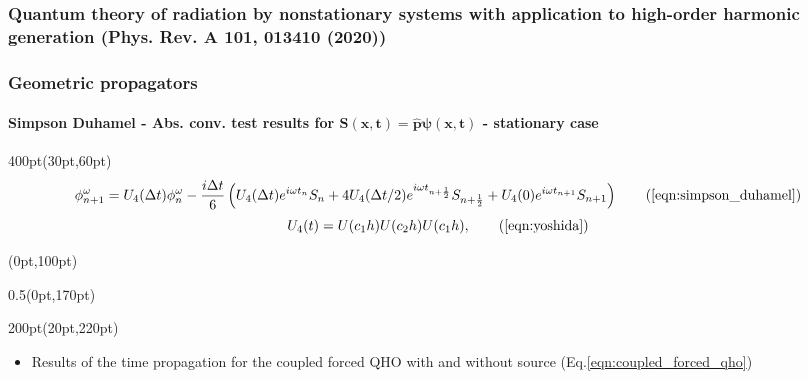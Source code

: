 \begin{frame}
\frametitle{Quantum theory of radiation by nonstationary systems 
	with application to high-order harmonic generation
        (Phys. Rev. A 101, 013410 (2020))}
\frametitle{Geometric propagators}
	\framesubtitle{Simpson Duhamel -
	Abs. conv. test results for 
	$\mathbf{S(x,t) = \hat{p}\psi(x,t)}$ - stationary case }
\footnotesize
\begin{textblock*}{400pt}(30pt,60pt)
	\begin{equation}
		\phi^\omega_{n+1} = U_4(\Delta t) \phi^\omega_{n}
		- \frac{i\Delta t}{6}\left(
		  U_4(\Delta t)  e^{i\omega t_{n}}     S_{n}
		+ 4 U_4(\Delta t/2) e^{i\omega t_{n+\frac{1}{2}}} S_{n+\frac{1}{2}}
		+   U_4(0) e^{i\omega t_{n+1}} S_{n+1}
		\right)
		 \tag{\ref{eqn:simpson_duhamel}}
	\end{equation}
 	\begin{equation}
		U_4(t) =  U(c_1h)  U(c_2h)  U(c_1h),    
		 \tag{\ref{eqn:yoshida}}
 	\end{equation}
\end{textblock*}

\footnotesize
\begin{textblock*}{\linewidth}(0pt,100pt)
\end{textblock*}
\begin{textblock*}{0.5\linewidth}(0pt,170pt)
\end{textblock*}


\begin{textblock*}{200pt}(20pt,220pt)
	\begin{itemize}
	 \item Results of the time propagation for the coupled forced QHO
		 with and without source (Eq.\ref{eqn:coupled_forced_qho})
	\end{itemize}
\end{textblock*}



\end{frame}
